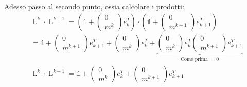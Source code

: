 \documentclass{article}
\begin{document}
Adesso passo al secondo punto, ossia calcolare i prodotti:
\begin{align*}
     & \operatorname{L}^{k}\cdot\operatorname{L}^{k+1}=\left(\mathbb 1+\begin{pmatrix}
                                                                               0 \\
                                                                               m^k
                                                                           \end{pmatrix}e^T_k\right)\cdot
    \left(\mathbb 1+\begin{pmatrix}
                        0 \\
                        m^{k+1}
                    \end{pmatrix}e^T_{k+1}\right)                                                     \\
     & =\mathbb 1+\begin{pmatrix}
                      0 \\
                      m^{k+1}
                  \end{pmatrix}e^T_{k+1}+
    \begin{pmatrix}
        0 \\
        m^k
    \end{pmatrix}e^T_k+\underbrace{\begin{pmatrix}
                                           0 \\
                                           m^k
                                       \end{pmatrix}e^T_k
    \begin{pmatrix}
            0 \\
            m^{k+1}
        \end{pmatrix}e^T_{k+1}}_{\text{Come prima }=0}                                                    \\
     & \operatorname{L}^{k}\cdot\operatorname{L}^{k+1}=\mathbb 1+\begin{pmatrix}
                                                                     0 \\
                                                                     m^k
                                                                 \end{pmatrix}e^T_k+
    \begin{pmatrix}
        0 \\
        m^{k+1}
    \end{pmatrix}e^T_{k+1}
\end{align*}
\end{document}
